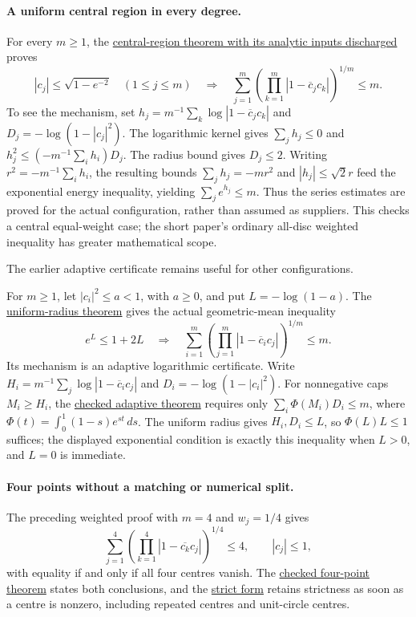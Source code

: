 \documentclass[11pt]{article}
\begin{document}
\paragraph{A uniform central region in every degree.}
For every $m\ge1$, the
\href{https://github.com/wcook04/plectis-erdos/blob/3be82b1a7340284aea72e9a5c8493cb020843921/ErdosProblems/Erdos1041/FreePointCentralCompletion.lean#L39}{central-region theorem with its analytic inputs discharged}
proves
\[
 |c_j|\le\sqrt{1-e^{-2}}\quad(1\le j\le m)
 \quad\Longrightarrow\quad
 \sum_{j=1}^m\left(\prod_{k=1}^m|1-\overline c_jc_k|\right)^{1/m}\le m.
\]
To see the mechanism, set
$h_j=m^{-1}\sum_k\log|1-\overline c_jc_k|$ and
$D_j=-\log(1-|c_j|^2)$.  The logarithmic kernel gives
$\sum_jh_j\le0$ and
$h_j^2\le(-m^{-1}\sum_i h_i)D_j$.  The radius bound gives $D_j\le2$.
Writing $r^2=-m^{-1}\sum_i h_i$, the resulting bounds
$\sum_jh_j=-mr^2$ and $|h_j|\le\sqrt2r$ feed the exponential energy
inequality, yielding $\sum_j e^{h_j}\le m$.  Thus the series estimates are
proved for the actual configuration, rather than assumed as suppliers.
This checks a central equal-weight case; the short paper's ordinary
all-disc weighted inequality has greater mathematical scope.

The earlier adaptive certificate remains useful for other configurations.

For $m\ge1$, let $|c_i|^2\le a<1$, with $a\ge0$, and put
$L=-\log(1-a)$. The
\href{https://github.com/wcook04/plectis-erdos/blob/457e0c74b2666f7fb2d825c967e49e439a600b23/ErdosProblems/Erdos1041/FreePointUniformRadius.lean#L84}{uniform-radius theorem}
gives the actual geometric-mean inequality
\[
 e^L\le1+2L\quad\Longrightarrow\quad
 \sum_{i=1}^m\left(\prod_{j=1}^m|1-\overline c_i c_j|\right)^{1/m}\le m.
\]
Its mechanism is an adaptive logarithmic certificate. Write
$H_i=m^{-1}\sum_j\log|1-\overline c_i c_j|$ and
$D_i=-\log(1-|c_i|^2)$. For nonnegative caps $M_i\ge H_i$, the
\href{https://github.com/wcook04/plectis-erdos/blob/0d34630e1cc9d2b1ac6edfa7cfdba83b31bdc8fe/ErdosProblems/Erdos1041/LogKernelCentralCertificate.lean#L99}{checked adaptive theorem}
requires only $\sum_i\Phi(M_i)D_i\le m$, where
$\Phi(t)=\int_0^1(1-s)e^{st}\,ds$.
The uniform radius gives $H_i,D_i\le L$, so $\Phi(L)L\le1$
suffices; the displayed exponential condition is exactly this inequality
when $L>0$, and $L=0$ is immediate.

\paragraph{Four points without a matching or numerical split.}
The preceding weighted proof with $m=4$ and $w_j=1/4$ gives
\[
 \sum_{j=1}^4\left(\prod_{k=1}^4|1-\overline{c_k}c_j|\right)^{1/4}\le4,
 \qquad |c_j|\le1,
\]
with equality if and only if all four centres vanish. The
\href{https://github.com/wcook04/plectis-erdos/blob/3f1a5e9b284b9c3348eebd549e24c2f3972606ae/ErdosProblems/Erdos1041/PaperWeightedCoverageR11.lean\#L146}{checked four-point theorem}
states both conclusions, and the
\href{https://github.com/wcook04/plectis-erdos/blob/3f1a5e9b284b9c3348eebd549e24c2f3972606ae/ErdosProblems/Erdos1041/PaperWeightedCoverageR11.lean\#L128}{strict form}
retains strictness as soon as a centre
is nonzero, including repeated centres and unit-circle centres.
\end{document}
